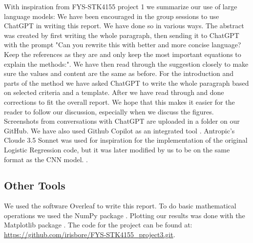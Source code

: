 With inspiration from FYS-STK4155 project 1 \cite{bore2023fysstk4155project1} we summarize our use of large language models: 
We have been encouraged in the group sessions to use ChatGPT \cite{openai2023chatgpt} in writing this report. We have done so in various ways. The abstract was created by first writing the whole paragraph, then sending it to ChatGPT with the prompt "Can you rewrite this with better and more concise language? Keep the references as they are and only keep the most important equations to explain the methods:". We have then read through the suggestion closely to make sure the values and content are the same as before. For the introduction and parts of the method we have asked ChatGPT to write the whole paragraph based on selected criteria and a template. After we have read through and done corrections to fit the overall report. We hope that this makes it easier for the reader to follow our discussion, especially when we discuss the figures. Screenshots from conversations with ChatGPT are uploaded in a folder on our GitHub. We have also used Github Copilot as an integrated tool \cite{github_copilot}. Antropic's Cloude 3.5 Sonnet was used for inspiration for the implementation of the original Logistic Regression code, but it was later modified by us to be on the same format as the CNN model. \cite{anthropic_claude_3_5_sonnet}. 


\subsection{Other Tools}

We used the software Overleaf to write this report. To do basic mathematical operations we used the NumPy package \cite{harris2020numpy}. Plotting our results was done with the Matplotlib package \cite{hunter-2007matplotlib}. The code for the project can be found at: \url{https://github.com/irisbore/FYS-STK4155_project3.git}.

